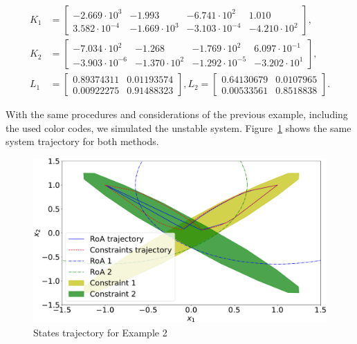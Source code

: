 \begin{align*}
  K_1 & = \begin{bmatrix}
    -2.669\cdot{}10^3   & -1.993            & -6.741\cdot{}10^2    & 1.010             \\
    3.582\cdot{}10^{-4} & -1.669\cdot{}10^3 & -3.103\cdot{}10^{-4} & -4.210\cdot{}10^2
  \end{bmatrix}, \\
  K_2 & = \begin{bmatrix}
    -7.034\cdot{}10^2    & -1.268            & -1.769\cdot{}10^2    & 6.097\cdot{}10^{-1} \\
    -3.903\cdot{}10^{-6} & -1.370\cdot{}10^2 & -1.292\cdot{}10^{-5} & -3.202\cdot{}10^1
  \end{bmatrix}, \\
  L_1 & = \begin{bmatrix}
    0.89374311 & 0.01193574 \\
    0.00922275 & 0.91488323
  \end{bmatrix},
  L_2 = \begin{bmatrix}
    0.64130679 & 0.0107965 \\
    0.00533561 & 0.8518838
  \end{bmatrix}.
\end{align*}
\normalsize

With the same procedures and considerations of the previous example, including
the used color codes, we simulated the unstable system.
Figure~\ref{fig:unstable-states} shows the same system trajectory for both
methods.

\begin{figure}[ht!]
  \centering
  \captionsetup{justification=centering}
  \includegraphics[width=\linewidth]{imgs/unstable_states}
  \caption{States trajectory for Example 2}%
  \label{fig:unstable-states}
\end{figure}

